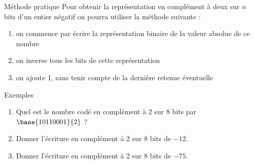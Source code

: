 \documentclass[10pt]{beamer}
\begin{document}
\begin{frame}{\Ctitle}{\stitle}
	\begin{block}{Méthode pratique}
		Pour obtenir la représentation en complément à deux sur $n$ bits d'un entier négatif on pourra utiliser la méthode suivante :
		\begin{enumerate}
			\item<2-> on commence par écrire la représentation binaire de la valeur absolue de ce nombre
			\item<3-> on inverse tous les bits de cette représentation
			\item<4-> on ajoute 1, sans tenir compte de la dernière retenue éventuelle
		\end{enumerate}
	\end{block}
	\begin{exampleblock}{Exemples}
		\begin{enumerate}
			\item<5-> Quel est le nombre codé en complément à 2 sur 8 bits par $\base{10110001}{2}$ ?
			\item<6-> Donner l'écriture en complément à 2 sur 8 bits de $-12$.
			\item<7-> Donner l'écriture en complément à 2 sur 8 bits de $-75$.
		\end{enumerate}
	\end{exampleblock}
\end{frame}
\end{document}
